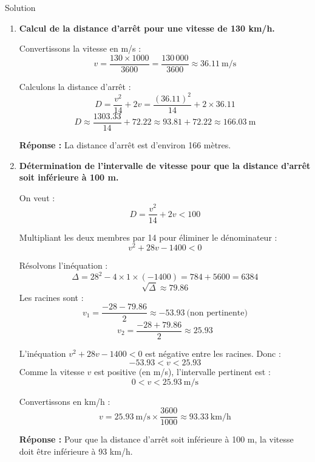 \documentclass[a4paper,12pt]{article}
\begin{document}
\begin{solutionbox}{Solution}
\begin{enumerate}
    \item \textbf{Calcul de la distance d'arrêt pour une vitesse de 130 km/h.}

    Convertissons la vitesse en m/s :
    \[
    v = \dfrac{130 \times 1000}{3600} = \dfrac{130\,000}{3600} \approx 36.11\ \text{m/s}
    \]

    Calculons la distance d'arrêt :
    \[
    D = \dfrac{v^2}{14} + 2v = \dfrac{(36.11)^2}{14} + 2 \times 36.11
    \]
    \[
    D \approx \dfrac{1303.33}{14} + 72.22 \approx 93.81 + 72.22 \approx 166.03\ \text{m}
    \]

    \textbf{Réponse :} La distance d'arrêt est d'environ 166 mètres.

    \item \textbf{Détermination de l'intervalle de vitesse pour que la distance d'arrêt soit inférieure à 100 m.}

    On veut :
    \[
    D = \dfrac{v^2}{14} + 2v < 100
    \]

    Multipliant les deux membres par 14 pour éliminer le dénominateur :
    \[
    v^2 + 28v - 1400 < 0
    \]

    Résolvons l'inéquation :
    \[
    \Delta = 28^2 - 4 \times 1 \times (-1400) = 784 + 5600 = 6384
    \]
    \[
    \sqrt{\Delta} \approx 79.86
    \]
    Les racines sont :
    \[
    v_1 = \dfrac{-28 - 79.86}{2} \approx -53.93\ \text{(non pertinente)}
    \]
    \[
    v_2 = \dfrac{-28 + 79.86}{2} \approx 25.93
    \]

    L'inéquation \(v^2 + 28v - 1400 < 0\) est négative entre les racines. Donc :
    \[
    -53.93 < v < 25.93
    \]
    Comme la vitesse \(v\) est positive (en m/s), l'intervalle pertinent est :
    \[
    0 < v < 25.93\ \text{m/s}
    \]

    Convertissons en km/h :
    \[
    v = 25.93\ \text{m/s} \times \dfrac{3600}{1000} \approx 93.33\ \text{km/h}
    \]

    \textbf{Réponse :} Pour que la distance d'arrêt soit inférieure à 100 m, la vitesse doit être inférieure à 93 km/h.

\end{enumerate}
\end{solutionbox}
\end{document}
